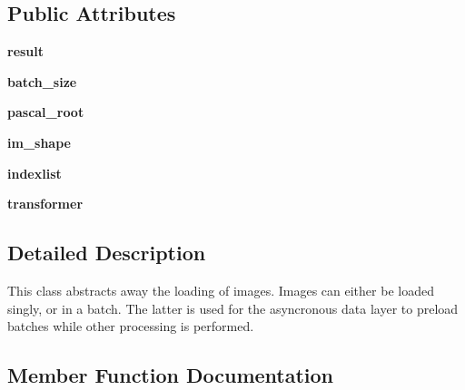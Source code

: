 \subsection*{Public Attributes}
\begin{DoxyCompactItemize}
\item 
\mbox{\label{classpascal__multilabel__datalayers_1_1_batch_loader_a54a4ec5cfef8bff834eca1761c9fd0ea}} 
{\bfseries result}
\item 
\mbox{\label{classpascal__multilabel__datalayers_1_1_batch_loader_a38dd5bd47fb302836947f332af9c225d}} 
{\bfseries batch\+\_\+size}
\item 
\mbox{\label{classpascal__multilabel__datalayers_1_1_batch_loader_abbf4baa8ca512be4c335d70550a062b4}} 
{\bfseries pascal\+\_\+root}
\item 
\mbox{\label{classpascal__multilabel__datalayers_1_1_batch_loader_a706a3a19c191054ec5ca7c1d38e66104}} 
{\bfseries im\+\_\+shape}
\item 
\mbox{\label{classpascal__multilabel__datalayers_1_1_batch_loader_aaef79e701ed6247ae8988d9aaa55708c}} 
{\bfseries indexlist}
\item 
\mbox{\label{classpascal__multilabel__datalayers_1_1_batch_loader_ab2599c26ac66da9865c27f121e73a9d5}} 
{\bfseries transformer}
\end{DoxyCompactItemize}


\subsection{Detailed Description}
\begin{DoxyVerb}This class abstracts away the loading of images.
Images can either be loaded singly, or in a batch. The latter is used for
the asyncronous data layer to preload batches while other processing is
performed.
\end{DoxyVerb}
 

\subsection{Member Function Documentation}
\mbox{\label{classpascal__multilabel__datalayers_1_1_batch_loader_a58069173aff314092d015903b1f8c360}} 
